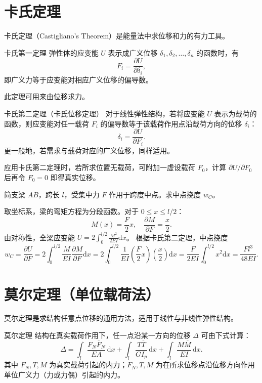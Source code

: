 \section{卡氏定理}

卡氏定理（Castigliano's Theorem）是能量法中求位移和力的有力工具。

\begin{myTheorem}{卡氏第一定理}
    弹性体的应变能 \(U\) 表示成广义位移 \(\delta_1,\delta_2,\dots,\delta_n\) 的函数时，有
    \[
    F_i = \frac{\partial U}{\partial \delta_i},
    \]
    即广义力等于应变能对相应广义位移的偏导数。
\end{myTheorem}
此定理可用来由位移求力。

\begin{myTheorem}{卡氏第二定理（卡氏位移定理）}
    对于线性弹性结构，若将应变能 \(U\) 表示为载荷的函数，则应变能对任一载荷 \(F_i\) 的偏导数等于该载荷作用点沿载荷方向的位移 \(\delta_i\)：
    \[
    \delta_i = \frac{\partial U}{\partial F_i}.
    \]
    更一般地，若需求与载荷对应的广义位移，同样适用。
\end{myTheorem}

应用卡氏第二定理时，若所求位置无载荷，可附加一虚设载荷 \(F_0\)，计算 \(\partial U/\partial F_0\) 后再令 \(F_0=0\) 即得真实位移。

\begin{example}
    简支梁 \(AB\)，跨长 \(l\)，受集中力 \(F\) 作用于跨度中点。求中点挠度 \(w_C\)。
\end{example}
\begin{solution}
    取坐标系，梁的弯矩方程为分段函数。对于 \(0 \le x \le l/2\)：
    \[
    M(x) = \frac{F}{2}x, \quad \frac{\partial M}{\partial F} = \frac{x}{2}.
    \]
    由对称性，全梁应变能 \(U = 2\int_0^{l/2} \frac{M^2}{2EI}\mathrm{d}x\)。
    根据卡氏第二定理，中点挠度
    \[
    w_C = \frac{\partial U}{\partial F} = 2\int_0^{l/2} \frac{M}{EI} \frac{\partial M}{\partial F}\mathrm{d}x
    = 2\int_0^{l/2} \frac{1}{EI}\left(\frac{F}{2}x\right)\left(\frac{x}{2}\right)\mathrm{d}x
    = \frac{F}{2EI} \int_0^{l/2} x^2 \mathrm{d}x = \frac{Fl^3}{48EI}.
    \]
\end{solution}

\section{莫尔定理（单位载荷法）}

莫尔定理是求结构任意点位移的通用方法，适用于线性与非线性弹性结构。

\begin{myTheorem}{莫尔定理}
    结构在真实载荷作用下，任一点沿某一方向的位移 \(\Delta\) 可由下式计算：
    \[
    \Delta = \int_l \frac{F_N \overline{F}_N}{EA}\,\mathrm{d}x + \int_l \frac{T \overline{T}}{GI_p}\,\mathrm{d}x + \int_l \frac{M \overline{M}}{EI}\,\mathrm{d}x.
    \]
    其中 \(F_N, T, M\) 为真实载荷引起的内力；\(\overline{F}_N, \overline{T}, \overline{M}\) 为在所求位移点沿位移方向作用单位广义力（力或力偶）引起的内力。
\end{myTheorem}

